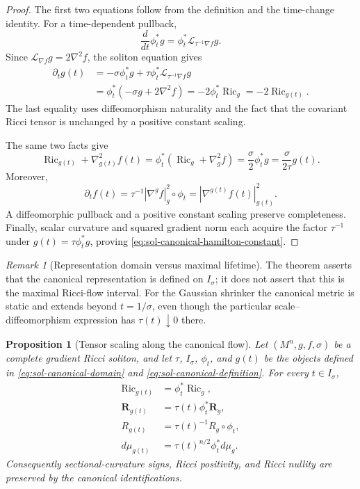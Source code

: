 \documentclass[10pt]{coll-l}
\newtheorem{proposition}[theorem]{Proposition}
\theoremstyle{definition}
\theoremstyle{remark}
\newtheorem{remark}[theorem]{Remark}
\numberwithin{section}{chapter}
\numberwithin{equation}{chapter}
\newcommand{\Ric}{\operatorname{Ric}}
\begin{document}
\begin{proof}
The first two equations follow from the definition and the time-change
identity.  For a time-dependent pullback,
\[
 \frac d{dt}\phi_t^*g
   =\phi_t^*\mathcal L_{\tau^{-1}\nabla f}g.
\]
Since $\mathcal L_{\nabla f}g=2\nabla^2f$, the soliton equation gives
\begin{align*}
 \partial_tg(t)
 &=-\sigma\phi_t^*g
      +\tau\phi_t^*\mathcal L_{\tau^{-1}\nabla f}g\\
 &=\phi_t^*(-\sigma g+2\nabla^2f)
  =-2\phi_t^*\Ric_g
  =-2\Ric_{g(t)}.
\end{align*}
The last equality uses diffeomorphism naturality and the fact that the
covariant Ricci tensor is unchanged by a positive constant scaling.

The same two facts give
\[
 \Ric_{g(t)}+\nabla_{g(t)}^2f(t)
 =\phi_t^*(\Ric_g+\nabla_g^2f)
 =\frac\sigma2\phi_t^*g
 =\frac{\sigma}{2\tau}g(t).
\]
Moreover,
\[
 \partial_tf(t)
 =\tau^{-1}|\nabla^gf|_g^2\circ\phi_t
 =|\nabla^{g(t)}f(t)|_{g(t)}^2.
\]
A diffeomorphic pullback and a positive constant scaling preserve
completeness.  Finally, scalar curvature and squared gradient norm each
acquire the factor $\tau^{-1}$ under
$g(t)=\tau\phi_t^*g$, proving
\eqref{eq:sol-canonical-hamilton-constant}.
\end{proof}

\begin{remark}[Representation domain versus maximal lifetime]
\label{rem:sol-canonical-domain}
The theorem asserts that the canonical representation is defined on
$I_\sigma$; it does not assert that this is the maximal Ricci-flow interval.
For the Gaussian shrinker the canonical metric is static and extends beyond
$t=1/\sigma$, even though the particular scale--diffeomorphism expression
has $\tau(t)\downarrow0$ there.
\end{remark}

\begin{proposition}[Tensor scaling along the canonical flow]
\label{prop:sol-canonical-tensor-scaling}
Let $(M^n,g,f,\sigma)$ be a complete gradient Ricci soliton, and let
$\tau$, $I_\sigma$, $\phi_t$, and $g(t)$ be the objects defined in
\eqref{eq:sol-canonical-domain} and
\eqref{eq:sol-canonical-definition}.  For every $t\in I_\sigma$,
\begin{align}
 \Ric_{g(t)}&=\phi_t^*\Ric_g,                             \label{eq:sol-canonical-ricci-scaling}\\
 \mathbf R_{g(t)}&=\tau(t)\phi_t^*\mathbf R_g,           \label{eq:sol-canonical-rm-scaling}\\
 R_{g(t)}&=\tau(t)^{-1}R_g\circ\phi_t,                   \label{eq:sol-canonical-scalar-scaling}\\
 d\mu_{g(t)}&=\tau(t)^{n/2}\phi_t^*d\mu_g.               \label{eq:sol-canonical-volume-scaling}
\end{align}
Consequently sectional-curvature signs, Ricci positivity, and Ricci nullity
are preserved by the canonical identifications.
\end{proposition}
\end{document}
